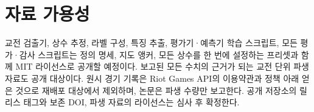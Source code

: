 \section{자료 가용성}

교전 검출기, 상수 추정, 라벨 구성, 특징 추출, 평가기·예측기 학습 스크립트, 모든 평가·감사 스크립트는 정의 명세, 지도 앵커, 모든 상수를 한 번에 설정하는 프리셋과 함께 MIT 라이선스로 공개할 예정이다. 보고된 모든 수치의 근거가 되는 교전 단위 파생 자료도 공개 대상이다. 원시 경기 기록은 Riot Games API의 이용약관과 정책 아래 얻은 것으로 재배포 대상에서 제외하며, 논문은 파생 수량만 보고한다. 공개 저장소의 릴리스 태그와 보존 DOI, 파생 자료의 라이선스는 심사 후 확정한다. 
